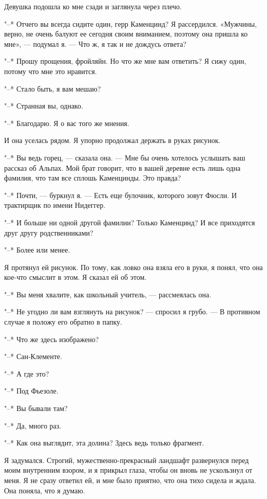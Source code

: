 Девушка подошла ко мне сзади и заглянула через плечо.

"--*  Отчего вы  всегда сидите  один, герр  Каменцинд? Я  рассердился.
«Мужчины, верно, не  очень балуют ее сегодня  своим вниманием, поэтому
она пришла  ко мне»,  --- подумал  я. --- Что  ж, я  так и  не дождусь
ответа?

"--* Прошу  прощения, фройляйн.  Но что  же мне  вам ответить?  Я сижу
один, потому что мне это нравится.

"--* Стало быть, я вам мешаю?

"--* Странная вы, однако.

"--* Благодарю. Я о вас того же мнения.

И она уселась рядом. Я упорно продолжал держать в руках рисунок.

"--*  Вы ведь  горец,  ---  сказала она.  ---  Мне  бы очень  хотелось
услышать ваш рассказ об Альпах. Мой  брат говорит, что в вашей деревне
есть лишь одна фамилия, что там все сплошь Каменцинды. Это правда?

"--*  Почти, ---  буркнул я.  ---  Есть еще  булочник, которого  зовут
Фюсли. И трактирщик по имени Нидеггер.

"--*  И  больше ни  одной  другой  фамилии?  Только Каменцинд?  И  все
приходятся друг другу родственниками?

"--* Более или менее.

Я протянул  ей рисунок.  По тому, как  ловко она взяла  его в  руки, я
понял, что она кое-что смыслит в этом. Я сказал ей об этом.

"--* Вы меня хвалите, как школьный учитель, --- рассмеялась она.

"--* Не угодно ли вам взглянуть на рисунок? --- спросил я грубо. --- В
противном случае я положу его обратно в папку.

"--* Что же здесь изображено?

"--* Сан-Клементе.

"--* А где это?

"--* Под Фьезоле.

"--* Вы бывали там?

"--* Да, много раз.

"--* Как она выглядит, эта долина? Здесь ведь только фрагмент.

Я  задумался.  Строгий,  мужественно-прекрасный  ландшафт  развернулся
перед моим  внутренним взором, и  я прикрыл  глаза, чтобы он  вновь не
ускользнул от меня. Я не сразу ответил ей, и мне было приятно, что она
тихо сидела и ждала. Она поняла, что я думаю.

